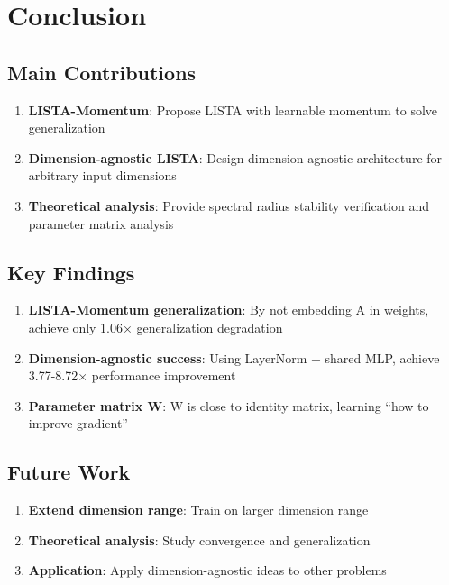 \documentclass[11pt,a4paper]{article}
\begin{document}
\section{Conclusion}
\label{sec:conclusion}

\subsection{Main Contributions}

\begin{enumerate}
    \item \textbf{LISTA-Momentum}: Propose LISTA with learnable momentum to solve generalization
    \item \textbf{Dimension-agnostic LISTA}: Design dimension-agnostic architecture for arbitrary input dimensions
    \item \textbf{Theoretical analysis}: Provide spectral radius stability verification and parameter matrix analysis
\end{enumerate}

\subsection{Key Findings}

\begin{enumerate}
    \item \textbf{LISTA-Momentum generalization}: By not embedding A in weights, achieve only 1.06× generalization degradation
    \item \textbf{Dimension-agnostic success}: Using LayerNorm + shared MLP, achieve 3.77-8.72× performance improvement
    \item \textbf{Parameter matrix W}: W is close to identity matrix, learning ``how to improve gradient''
\end{enumerate}

\subsection{Future Work}

\begin{enumerate}
    \item \textbf{Extend dimension range}: Train on larger dimension range
    \item \textbf{Theoretical analysis}: Study convergence and generalization
    \item \textbf{Application}: Apply dimension-agnostic ideas to other problems
\end{enumerate}
\end{document}

